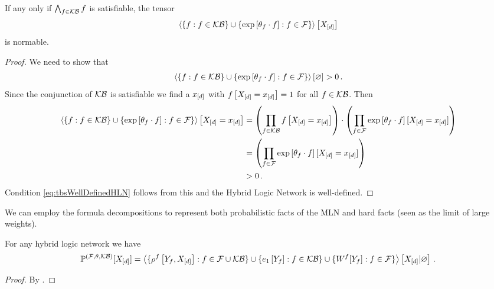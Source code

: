 \begin{theorem}
	If any only if $\bigwedge_{f\in\mathcal{KB}}f$ is satisfiable, the tensor 
		\[  \left\langle 
		\{f : f\in\mathcal{KB}\} \cup \{\mathrm{exp}\left[\theta_{f}\cdot f\right] : f\in\mathcal{F}\}
		\right\rangle \left[ X_{[d]} \right] \]
	is normable.
\end{theorem}
\begin{proof}
	We need to show that
	\begin{align}\label{eq:tbsWellDefinedHLN}
		\left\langle \{f : f\in\mathcal{KB}\} \cup \{\mathrm{exp}\left[\theta_{f}\cdot f\right] : f\in\mathcal{F}\}\right\rangle \left[ \varnothing \right] > 0 \, . 
	\end{align}
	Since the conjunction of $\mathcal{KB}$ is satisfiable we find a $x_{[d]}$ with $f\left[X_{[d]}=x_{[d]}\right]=1$ for all $f\in\mathcal{KB}$.
	Then 
	\begin{align*}
		 \left\langle \{f : f\in\mathcal{KB}\} \cup \{\mathrm{exp}\left[\theta_{f}\cdot f\right] : f\in\mathcal{F}\}\right\rangle \left[ X_{[d]}=x_{[d]} \right]  
		 & = \left( \prod_{f\in\mathcal{KB}}f\left[X_{[d]}=x_{[d]}\right] \right) 
		 \cdot \left( \prod_{f\in\mathcal{F}}\mathrm{exp}\left[\theta_{f}\cdot f\right][X_{[d]}=x_{[d]}] \right) \\
		 & =  \left( \prod_{f\in\mathcal{F}}\mathrm{exp}\left[\theta_{f}\cdot f\right][X_{[d]}=x_{[d]}] \right) \\
		 & > 0 \, . 
	\end{align*}
	Condition \eqref{eq:tbsWellDefinedHLN} follows from this and the Hybrid Logic Network is well-defined.
\end{proof}



We can employ the formula decompositions to represent both probabilistic facts of the MLN and hard facts (seen as the limit of large weights).

\begin{theorem}\label{the:hybridNetworkRepresentation}
	For any hybrid logic network we have
	\begin{align*}
		\mathbb{P}^{(\mathcal{F},\theta,\mathcal{KB})}[X_{[d]}] 
		= \left\langle 
		\{\rho^{f}\left[Y_{f},X_{[d]}\right] : f\in\mathcal{F}\cup\mathcal{KB} \}
		\cup \{e_1\left[Y_{f}\right] : f\in\mathcal{KB} \}
		\cup \{W^{f}[Y_{f}] : f\in\mathcal{F} \}
		\right\rangle \left[ X_{[d]} | \varnothing \right] \, . 
	\end{align*}
\end{theorem}
\begin{proof}
	By .
\end{proof}

